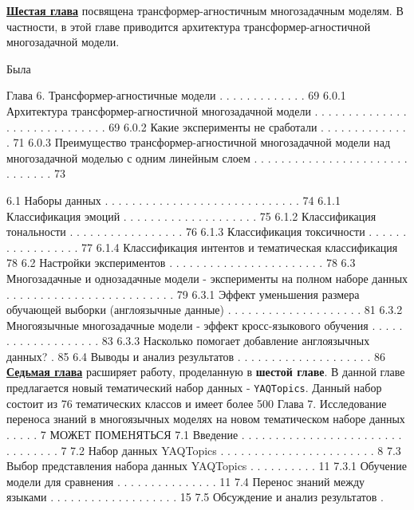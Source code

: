 \underline{\textbf{Шестая глава}} посвящена трансформер-агностичным многозадачным моделям. В частности, в этой главе приводится архитектура трансформер-агностичной многозадачной модели. 

Была 

Глава 6. Трансформер-агностичные модели . . . . . . . . . . . . . 69
6.0.1 Архитектура трансформер-агностичной многозадачной
модели . . . . . . . . . . . . . . . . . . . . . . . . . . . . . 69
6.0.2 Какие эксперименты не сработали . . . . . . . . . . . . . . 71
6.0.3 Преимущество трансформер-агностичной многозадачной
модели над многозадачной моделью с одним линейным
слоем . . . . . . . . . . . . . . . . . . . . . . . . . . . . . . 73

6.1 Наборы данных . . . . . . . . . . . . . . . . . . . . . . . . . . . . . 74
6.1.1 Классификация эмоций . . . . . . . . . . . . . . . . . . . . 75
6.1.2 Классификация тональности . . . . . . . . . . . . . . . . . 76
6.1.3 Классификация токсичности . . . . . . . . . . . . . . . . . 77
6.1.4 Классификация интентов и тематическая классификация 78
6.2 Настройки экспериментов . . . . . . . . . . . . . . . . . . . . . . . 78
6.3 Многозадачные и однозадачные модели - эксперименты на
полном наборе данных . . . . . . . . . . . . . . . . . . . . . . . . . 79
6.3.1 Эффект уменьшения размера обучающей выборки
(англоязычные данные) . . . . . . . . . . . . . . . . . . . . 81
6.3.2 Многоязычные многозадачные модели - эффект
кросс-языкового обучения . . . . . . . . . . . . . . . . . . . 83
6.3.3 Насколько помогает добавление англоязычных данных? . 85
6.4 Выводы и анализ результатов . . . . . . . . . . . . . . . . . . . . 86
\underline{\textbf{Седьмая глава}} расширяет работу, проделанную в \textbf{шестой главе}. В данной главе предлагается новый тематический набор данных - \texttt{YAQTopics}.  Данный набор состоит из 76 тематических классов и имеет более 500 
Глава 7. Исследование переноса знаний в многоязычных
моделях на новом тематическом наборе данных . . . . . 7 МОЖЕТ ПОМЕНЯТЬСЯ
7.1 Введение . . . . . . . . . . . . . . . . . . . . . . . . . . . . . . . . 7
7.2 Набор данных YAQTopics . . . . . . . . . . . . . . . . . . . . . . . 8
7.3 Выбор представления набора данных YAQTopics . . . . . . . . . . 11
7.3.1 Обучение модели для сравнения . . . . . . . . . . . . . . . 11
7.4 Перенос знаний между языками . . . . . . . . . . . . . . . . . . . 15
7.5 Обсуждение и анализ результатов .

\fi

